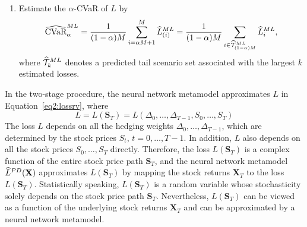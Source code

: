 \begin{algorithm}
\begin{algorithmic}[1]
\begin{enumerate} [label=\alph*., itemsep=0pt, parsep=0pt, topsep=0pt]
        \item Estimate the $\alpha$-CVaR of $L$ by 
        $$\widehat{\mbox{CVaR}}^{ML}_\alpha = \frac{1}{(1-\alpha)M} \sum_{i=\alpha M + 1}^{M}\widehat{L}_{(i)}^{ML} = \frac{1}{(1-\alpha)M} \sum_{i \in \widehat{\mathcal{T}}_{(1-\alpha)M}^{ML}}\widehat{L}_{i}^{ML},$$ 
        where $\widehat{\mathcal{T}}_{k}^{ML}$ denotes a predicted tail scenario set associated with the largest $k$ estimated losses.
    \end{enumerate}
\end{algorithmic}
\end{algorithm}

In the two-stage procedure, the neural network metamodel approximates $L$ in Equation~\ref{eq2:lossrv}, where 
\begin{equation}
    L = L(\mathbf{S}_T) = L(\Delta_0, \ldots, \Delta_{T-1}, S_0, \ldots, S_T)
\end{equation}
The loss $L$ depends on all the hedging weights $\Delta_0, \ldots, \Delta_{T-1}$, which are determined by the stock prices $S_t$, $t=0,\ldots,T-1$.
In addition, $L$ also depends on all the stock prices $S_0, \ldots, S_T$ directly.
Therefore, the loss $L(\mathbf{S}_T)$ is a complex function of the entire stock price path $\mathbf{S}_T$, and the neural network metamodel $\widehat{L}^{PD}(\mathbf{X})$ approximates $L(\mathbf{S}_T)$ by mapping the stock returns $\mathbf{X}_T$ to the loss $L(\mathbf{S}_T)$.
Statistically speaking, $L(\mathbf{S}_T)$ is a random variable whose stochasticity solely depends on the stock price path $\mathbf{S}_T$. 
Nevertheless, $L(\mathbf{S}_T)$ can be viewed as a function of the underlying stock returns $\mathbf{X}_T$ and can be approximated by a neural network metamodel.


